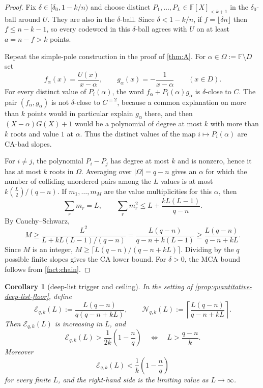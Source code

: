\documentclass[11pt]{article}
\newtheorem{corollary}[theorem]{Corollary}
\theoremstyle{definition}
\theoremstyle{remark}
\newcommand{\F}{\mathbb{F}}
\begin{document}
\begin{proof}
Fix $\delta\in[\delta_0,1-k/n)$ and choose distinct
$P_1,\ldots,P_L\in\F[X]_{<k+1}$ in the $\delta_0$-ball around $U$.
They are also in the $\delta$-ball.  Since $\delta<1-k/n$, if
$f=\lfloor\delta n\rfloor$ then $f\le n-k-1$, so every codeword in this
$\delta$-ball agrees with $U$ on at least $a=n-f>k$ points.

Repeat the simple-pole construction in the proof of \cref{thm:A}.  For
$\alpha\in\Omega:=\F\setminus D$ set
\[
        f_\alpha(x)=\frac{U(x)}{x-\alpha},
        \qquad
        g_\alpha(x)=-\frac1{x-\alpha}
        \qquad (x\in D).
\]
For every distinct value of $P_i(\alpha)$, the word
$f_\alpha+P_i(\alpha)g_\alpha$ is $\delta$-close to $C$.  The pair
$(f_\alpha,g_\alpha)$ is not $\delta$-close to $C^{\equiv2}$, because a
common explanation on more than $k$ points would in particular explain
$g_\alpha$ there, and then $(X-\alpha)G(X)+1$ would be a polynomial of degree at most $k$ with more than $k$ roots and value $1$ at $\alpha$.
Thus the distinct values of the map $i\mapsto P_i(\alpha)$ are CA-bad
slopes.

For $i\ne j$, the polynomial $P_i-P_j$ has degree at most $k$ and is
nonzero, hence it has at most $k$ roots in $\Omega$.  Averaging over
$|\Omega|=q-n$ gives an $\alpha$ for which the number of colliding
unordered pairs among the $L$ values is at most $k\binom L2/(q-n)$.  If
$m_1,\ldots,m_M$ are the value multiplicities for this $\alpha$, then
\[
        \sum_r m_r=L,
        \qquad
        \sum_r m_r^2
        \le L+\frac{kL(L-1)}{q-n}.
\]
By Cauchy--Schwarz,
\[
        M\ge
        \frac{L^2}{L+kL(L-1)/(q-n)}
        =
        \frac{L(q-n)}{q-n+k(L-1)}
        \ge
        \frac{L(q-n)}{q-n+kL}.
\]
Since $M$ is an integer, $M\ge\lceil L(q-n)/(q-n+kL)\rceil$.  Dividing
by the $q$ possible finite slopes gives the CA lower bound.  For $\delta>0$, the MCA
bound follows from \cref{fact:chain}.
\end{proof}

\begin{corollary}[deep-list trigger and ceiling]
\label{cor:deep-list-trigger-ceiling}
In the setting of \cref{prop:quantitative-deep-list-floor}, define
\[
        \mathcal E_{q,k}(L)
        :=\frac{L(q-n)}{q(q-n+kL)},
        \qquad
        \mathcal N_{q,k}(L)
        :=\left\lceil\frac{L(q-n)}{q-n+kL}\right\rceil .
\]
Then $\mathcal E_{q,k}(L)$ is increasing in $L$, and
\[
        \mathcal E_{q,k}(L)>
        \frac1{2k}\left(1-\frac nq\right)
        \quad\Longleftrightarrow\quad
        L>\frac{q-n}{k}.
\]
Moreover
\[
        \mathcal E_{q,k}(L)<\frac1k\left(1-\frac nq\right)
\]
for every finite $L$, and the right-hand side is the limiting value as
$L\to\infty$.
\end{corollary}
\end{document}
